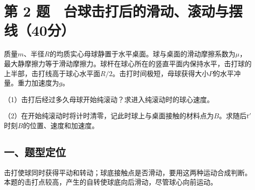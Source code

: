 \documentclass[12pt,a4paper,fontset=fandol]{ctexart}
\begin{document}
\clearpage

\section{第 2
题　台球击打后的滑动、滚动与摆线（40分）}\label{ux7b2c-2-ux9898-ux53f0ux7403ux51fbux6253ux540eux7684ux6ed1ux52a8ux6edaux52a8ux4e0eux6446ux7ebf40ux5206}

质量\(m\)、半径\(R\)的均质实心母球静置于水平桌面。球与桌面的滑动摩擦系数为\(\mu\)，最大静摩擦力等于滑动摩擦力。球杆在球心所在的竖直平面内保持水平，击打球的上半部，击打线高于球心水平面\(R/2\)。击打时间极短，母球获得大小\(P\)的水平冲量。重力加速度为\(g\)。

\begin{center}
\begin{minipage}{\linewidth}
\centering\begingroup{}
\ifdim\wd\diagrambox>.88\linewidth
\sbox{\diagrambox}{\resizebox{.88\linewidth}{!}{\usebox{\diagrambox}}}\fi
\ifdim\ht\diagrambox>.38\textheight
\resizebox{!}{.38\textheight}{\usebox{\diagrambox}}
\else\usebox{\diagrambox}\fi
\par{}\endgroup\end{minipage}\end{center}

（1）击打后经过多久母球开始纯滚动？求进入纯滚动时的球心速度。

（2）在开始纯滚动时将计时清零，记此时球上与桌面接触的材料点为\(B\)。求随后\(t'\)时刻\(B\)的位置、速度和加速度。

\subsection{一、题型定位}\label{ux4e00ux9898ux578bux5b9aux4f4d-1}

击打使球同时获得平动和转动；球底接触点是否滑动，要用这两种运动合成判断。本题的击打点较高，产生的自转使球底向后滑动，尽管球心向前运动。
\end{document}
